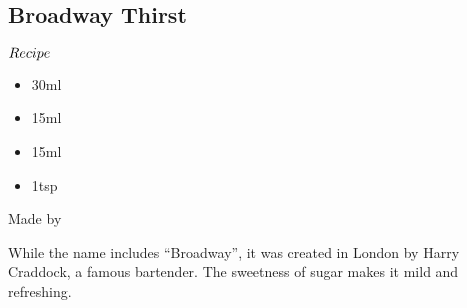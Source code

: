 \subsection{Broadway Thirst}
\begin{itembox}[l]{\boldmath $Recipe$}
\begin{itemize}
\setlength{\parskip}{0cm}
\setlength{\itemsep}{0cm}
\item \teq 30ml
\item \oj 15ml
\item \lj 15ml
\item \sugar 1tsp
\end{itemize}
\vspace{-4mm}
Made by \shake
\end{itembox}
While the name includes ``Broadway'', it was created in London by Harry Craddock, a famous bartender. The sweetness of sugar makes it mild and refreshing.
